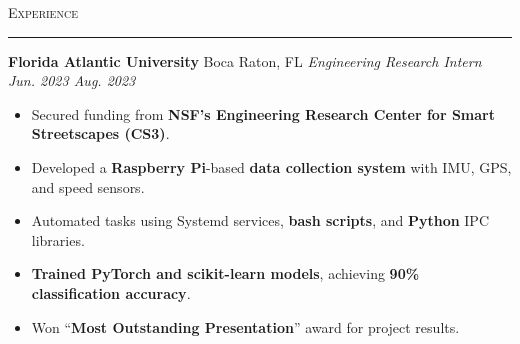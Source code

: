 \documentclass[11pt,letterpaper]{article}
\begin{document}
\vspace{4pt}
\textsc{\large{Experience}} 
\vspace{4pt}
\hrule
\begin{list}{}{\setlength{\leftmargin}{1em}\setlength{\rightmargin}{2pt}}
  
    \item
        \normalsize{\textbf{Florida Atlantic University}} \hfill Boca Raton, FL
          \vspace{2pt} \newline
          \small{\textit{Engineering Research Intern}} \hfill \small{\textit{Jun. 2023 \textendash \space Aug. 2023}}
          \vspace{0pt}
          \begin{itemize}[itemsep=-5pt, topsep=-2pt]
              \item Secured funding from \textbf{NSF's Engineering Research Center for Smart Streetscapes (CS3)}.
              \item Developed a \textbf{Raspberry Pi}-based \textbf{data collection system} with IMU, GPS, and speed sensors.
              \item Automated tasks using Systemd services, \textbf{bash scripts}, and \textbf{Python} IPC libraries.
              \item \textbf{Trained PyTorch and scikit-learn models}, achieving \textbf{90\% classification accuracy}.
              \item Won ``\textbf{Most Outstanding Presentation}'' award for project results.
          \end{itemize}
          \vspace{4pt}


\end{list}
\end{document}
